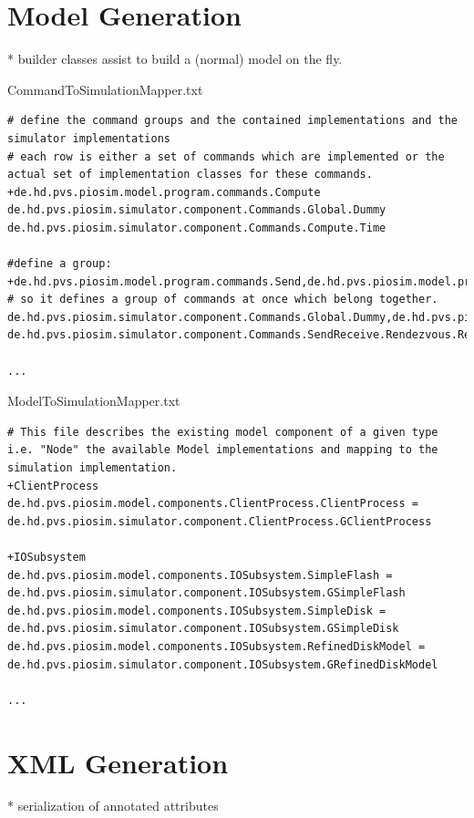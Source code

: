 \documentclass[
     11pt,         %
     a4paper,      %
     BCOR10mm,     %
     DIV14,        %
     liststotoc,   %
     bibtotoc,     %
     idxtotoc,     %
     parskip       %
     ]{scrreprt}   %
\begin{document}
\section{Model Generation}
* builder classes assist to build a (normal) model on the fly.

CommandToSimulationMapper.txt
\begin{verbatim}
# define the command groups and the contained implementations and the simulator implementations
# each row is either a set of commands which are implemented or the actual set of implementation classes for these commands.
+de.hd.pvs.piosim.model.program.commands.Compute
de.hd.pvs.piosim.simulator.component.Commands.Global.Dummy
de.hd.pvs.piosim.simulator.component.Commands.Compute.Time

#define a group:
+de.hd.pvs.piosim.model.program.commands.Send,de.hd.pvs.piosim.model.program.commands.Receive,de.hd.pvs.piosim.model.program.commands.Sendrecv # so it defines a group of commands at once which belong together.
de.hd.pvs.piosim.simulator.component.Commands.Global.Dummy,de.hd.pvs.piosim.simulator.component.Commands.Global.Dummy,de.hd.pvs.piosim.simulator.component.Commands.Global.Dummy
de.hd.pvs.piosim.simulator.component.Commands.SendReceive.Rendezvous.RendezvousSend,de.hd.pvs.piosim.simulator.component.Commands.SendReceive.Rendezvous.RendezvousRcv,de.hd.pvs.piosim.simulator.component.Commands.SendReceive.Rendezvous.RendezvousSendrecv

...
\end{verbatim}

ModelToSimulationMapper.txt
\begin{verbatim}
# This file describes the existing model component of a given type i.e. "Node" the available Model implementations and mapping to the simulation implementation.
+ClientProcess
de.hd.pvs.piosim.model.components.ClientProcess.ClientProcess = de.hd.pvs.piosim.simulator.component.ClientProcess.GClientProcess

+IOSubsystem
de.hd.pvs.piosim.model.components.IOSubsystem.SimpleFlash = de.hd.pvs.piosim.simulator.component.IOSubsystem.GSimpleFlash
de.hd.pvs.piosim.model.components.IOSubsystem.SimpleDisk = de.hd.pvs.piosim.simulator.component.IOSubsystem.GSimpleDisk
de.hd.pvs.piosim.model.components.IOSubsystem.RefinedDiskModel = de.hd.pvs.piosim.simulator.component.IOSubsystem.GRefinedDiskModel

...
\end{verbatim}


\section{XML Generation}
* serialization of annotated attributes
\end{document}
